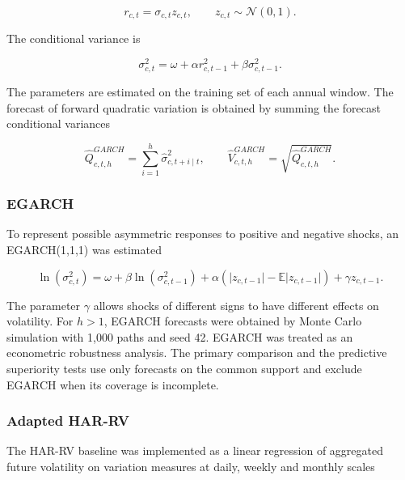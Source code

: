 \documentclass[a4paper,fleqn]{cas-sc}
\begin{document}
\begin{equation}
r_{c,t}=\sigma_{c,t}z_{c,t},
\qquad
z_{c,t}\sim\mathcal{N}(0,1).
\label{eq:garch_return}
\end{equation}

The conditional variance is

\begin{equation}
\sigma_{c,t}^{2}
=
\omega
+\alpha r_{c,t-1}^{2}
+\beta\sigma_{c,t-1}^{2}.
\label{eq:garch}
\end{equation}

The parameters are estimated on the training set of each annual window. The forecast of forward quadratic variation is obtained by summing the forecast conditional variances

\begin{equation}
\widehat{Q}^{GARCH}_{c,t,h}
=
\sum_{i=1}^{h}\widehat{\sigma}_{c,t+i\mid t}^{2},
\qquad
\widehat{V}^{GARCH}_{c,t,h}
=
\sqrt{\widehat{Q}^{GARCH}_{c,t,h}}.
\label{eq:garch_forecast}
\end{equation}

\subsubsection{EGARCH}

To represent possible asymmetric responses to positive and negative shocks, an EGARCH(1,1,1) was estimated \citep{Nelson1991EGARCH}

\begin{equation}
\ln\left(\sigma_{c,t}^{2}\right)
=
\omega
+\beta\ln\left(\sigma_{c,t-1}^{2}\right)
+\alpha\left(\lvert z_{c,t-1}\rvert-\mathbb{E}\lvert z_{c,t-1}\rvert\right)
+\gamma z_{c,t-1}.
\label{eq:egarch}
\end{equation}

The parameter \(\gamma\) allows shocks of different signs to have different effects on volatility. For \(h>1\), EGARCH forecasts were obtained by Monte Carlo simulation with 1,000 paths and seed 42. EGARCH was treated as an econometric robustness analysis. The primary comparison and the predictive superiority tests use only forecasts on the common support and exclude EGARCH when its coverage is incomplete.

\subsubsection{Adapted HAR-RV}

The HAR-RV baseline was implemented as a linear regression of aggregated future volatility on variation measures at daily, weekly and monthly scales \citep{Corsi2009HAR}
\end{document}
